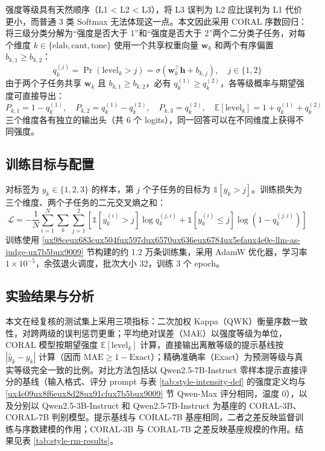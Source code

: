 \documentclass[fontset=fandol,type=master,campus=shenzhen,etitleauto=true]{hithesisbook}
\begin{document}
强度等级具有天然顺序（L1 < L2 < L3），将 L3 误判为 L2 应比误判为 L1 代价更小，而普通 3 类 Softmax 无法体现这一点。本文因此采用 CORAL 序数回归\cite{ref86}：将三级分类分解为“强度是否大于 1”和“强度是否大于 2”两个二分类子任务，对每个维度 $k \in \{\text{elab}, \text{caut}, \text{tone}\}$ 使用一个共享权重向量 $\mathbf{w}_k$ 和两个有序偏置 $b_{k,1} \ge b_{k,2}$：
\begin{equation}
q_k^{(j)} = \Pr(\text{level}_k > j) = \sigma\!\left(\mathbf{w}_k^{\top}\mathbf{h} + b_{k,j}\right), \quad j \in \{1, 2\}
\end{equation}
由于两个子任务共享 $\mathbf{w}_k$ 且 $b_{k,1} \ge b_{k,2}$，必有 $q_k^{(1)} \ge q_k^{(2)}$，各等级概率与期望强度可直接导出：
\begin{equation}
P_{k,1} = 1 - q_k^{(1)}, \quad P_{k,2} = q_k^{(1)} - q_k^{(2)}, \quad P_{k,3} = q_k^{(2)}, \quad \mathbb{E}[\text{level}_k] = 1 + q_k^{(1)} + q_k^{(2)}
\end{equation}
三个维度各有独立的输出头（共 6 个 logits），同一回答可以在不同维度上获得不同强度。

\subsection{训练目标与配置}\label{ux8badux7ec3ux76eeux6807ux4e0eux4f18ux5316ux914dux7f6e-1}

对标签为 $y_k \in \{1,2,3\}$ 的样本，第 $j$ 个子任务的目标为 $\mathbb{1}[y_k > j]$。训练损失为三个维度、两个子任务的二元交叉熵之和：
\begin{equation}
\mathcal{L} = -\frac{1}{N}\sum_{i=1}^{N} \sum_{k} \sum_{j=1}^{2} \left[ \mathbb{1}[y_k^{(i)} > j] \log q_k^{(j,i)} + \mathbb{1}[y_k^{(i)} \le j] \log\!\left(1 - q_k^{(j,i)}\right) \right]
\end{equation}
训练使用 \ref{ux98ceux683cux504fux597dux6570ux636eux6784ux5efaux4e0e-llm-as-judge-ux7b5bux9009} 节构建的约 1.2 万条训练集，采用 AdamW 优化器，学习率 $1 \times 10^{-5}$，余弦退火调度，批次大小 32，训练 3 个 epoch。

\subsection{实验结果与分析}\label{ux98ceux683cux5224ux522bux5b9eux9a8cux7ed3ux679c}

本文在经复核的测试集上采用三项指标：二次加权 Kappa（QWK）衡量序数一致性，对跨两级的误判惩罚更重；平均绝对误差（MAE）以强度等级为单位，CORAL 模型按期望强度 $\mathbb{E}[\text{level}_k]$ 计算，直接输出离散等级的提示基线按 $|\hat{y}_k - y_k|$ 计算（因而 $\text{MAE} \ge 1 - \text{Exact}$）；精确准确率（Exact）为预测等级与真实等级完全一致的比例。对比方法包括以 Qwen2.5-7B-Instruct 零样本提示直接评分的基线（输入格式、评分 prompt 与表 \ref{tab:style-intensity-def} 的强度定义均与 \ref{ux4e09ux8f6eux8d28ux91cfux7b5bux9009} 节 Qwen-Max 评分相同，温度 0），以及分别以 Qwen2.5-3B-Instruct 和 Qwen2.5-7B-Instruct 为基座的 CORAL-3B、CORAL-7B 判别模型。提示基线与 CORAL-7B 基座相同，二者之差反映监督训练与序数建模的作用；CORAL-3B 与 CORAL-7B 之差反映基座规模的作用。结果见表 \ref{tab:style-rm-results}。
\end{document}
